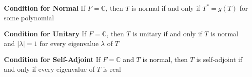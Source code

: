 \documentclass[11pt]{article}
\begin{document}
\begin{corollary*}
    \textbf{Condition for Normal} If $F=\mathbb{C}$, then $T$ is normal if and only if $T^* = g(T)$ for some polynomial 
\end{corollary*}

\begin{corollary*}
    \textbf{Condition for Unitary} If $F = \mathbb{C}$, then $T$ is unitary if and only if $T$ is normal and $|\lambda|=1$ for every eigenvalue $\lambda$ of $T$
\end{corollary*}

\begin{corollary*}
    \textbf{Condition for Self-Adjoint} If $F = \mathbb{C}$ and $T$ is normal, then $T$ is self-adjoint if and only if every eigenvalue of $T$ is real
\end{corollary*}
\end{document}

